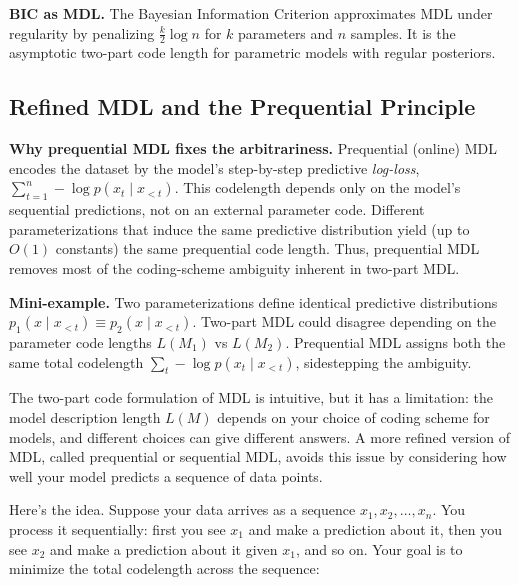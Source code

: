 \vspace{1em}


\vspace{0.3cm}
\textbf{BIC as MDL.} The Bayesian Information Criterion approximates MDL under regularity by penalizing $\tfrac{k}{2}\log n$ for $k$ parameters and $n$ samples. It is the asymptotic two-part code length for parametric models with regular posteriors.
\subsection{Refined MDL and the Prequential Principle}

\begin{keyinsight}
\textbf{Why prequential MDL fixes the arbitrariness.}
Prequential (online) MDL encodes the dataset by the model's step-by-step predictive \emph{log-loss}, $\sum_{t=1}^n -\log p(x_t \mid x_{<t})$.
This codelength depends only on the model's sequential predictions, not on an external parameter code.
Different parameterizations that induce the same predictive distribution yield (up to $O(1)$ constants) the same prequential code length.
Thus, prequential MDL removes most of the coding-scheme ambiguity inherent in two-part MDL.
\end{keyinsight}

\vspace{1.2em}

\begin{examplebox}
\textbf{Mini-example.} Two parameterizations define identical predictive distributions $p_1(x\mid x_{<t}) \equiv p_2(x\mid x_{<t})$.
Two-part MDL could disagree depending on the parameter code lengths $L(M_1)$ vs $L(M_2)$.
Prequential MDL assigns both the same total codelength $\sum_t -\log p(x_t\mid x_{<t})$, sidestepping the ambiguity.
\end{examplebox}

\vspace{1.5em}


The two-part code formulation of MDL is intuitive, but it has a limitation: the model description length $L(M)$ depends on your choice of coding scheme for models, and different choices can give different answers. A more refined version of MDL, called prequential or sequential MDL, avoids this issue by considering how well your model predicts a sequence of data points.

\vspace{0.3cm}

Here's the idea. Suppose your data arrives as a sequence $x_1, x_2, \ldots, x_n$. You process it sequentially: first you see $x_1$ and make a prediction about it, then you see $x_2$ and make a prediction about it given $x_1$, and so on. Your goal is to minimize the total codelength across the sequence:

